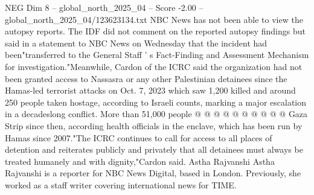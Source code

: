 \begin{textsample}{NEG Dim 8 – global\_north\_2025\_04 – Score -2.00 – global\_north\_2025\_04/123623134.txt}
NBC News has not been able to view the autopsy reports.
The IDF did not comment on the reported autopsy findings but said in a statement to NBC News on Wednesday that the incident had been"transferred to the General Staff ' s Fact-Finding and Assessment Mechanism for investigation."Meanwhile, Cardon of the ICRC said the organization had not been granted access to Nassasra or any other Palestinian detainees since the Hamas-led terrorist attacks on Oct. 7, 2023 which saw 1,200 killed and around 250 people taken hostage, according to Israeli counts, marking a major escalation in a decadeslong conflict.
More than 51,000 people @ @ @ @ @ @ @ @ @ @ Gaza Strip since then, according health officials in the enclave, which has been run by Hamas since 2007."The ICRC continues to call for access to all places of detention and reiterates publicly and privately that all detainees must always be treated humanely and with dignity,"Cardon said.
Astha Rajvanshi Astha Rajvanshi is a reporter for NBC News Digital, based in London.
Previously, she worked as a staff writer covering international news for TIME.

\end{textsample}
